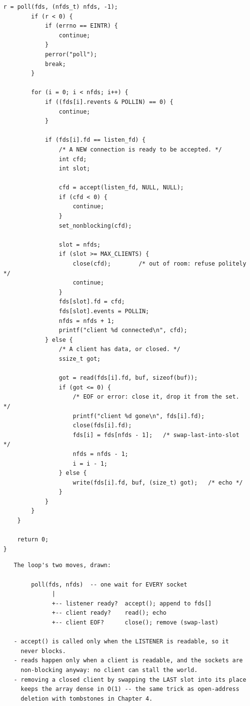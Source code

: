 \begin{lstlisting}[caption={echo\_server.c: a poll-driven, multi-client echo server.}]
        r = poll(fds, (nfds_t) nfds, -1);
        if (r < 0) {
            if (errno == EINTR) {
                continue;
            }
            perror("poll");
            break;
        }

        for (i = 0; i < nfds; i++) {
            if ((fds[i].revents & POLLIN) == 0) {
                continue;
            }

            if (fds[i].fd == listen_fd) {
                /* A NEW connection is ready to be accepted. */
                int cfd;
                int slot;

                cfd = accept(listen_fd, NULL, NULL);
                if (cfd < 0) {
                    continue;
                }
                set_nonblocking(cfd);

                slot = nfds;
                if (slot >= MAX_CLIENTS) {
                    close(cfd);        /* out of room: refuse politely */
                    continue;
                }
                fds[slot].fd = cfd;
                fds[slot].events = POLLIN;
                nfds = nfds + 1;
                printf("client %d connected\n", cfd);
            } else {
                /* A client has data, or closed. */
                ssize_t got;

                got = read(fds[i].fd, buf, sizeof(buf));
                if (got <= 0) {
                    /* EOF or error: close it, drop it from the set. */
                    printf("client %d gone\n", fds[i].fd);
                    close(fds[i].fd);
                    fds[i] = fds[nfds - 1];   /* swap-last-into-slot */
                    nfds = nfds - 1;
                    i = i - 1;
                } else {
                    write(fds[i].fd, buf, (size_t) got);   /* echo */
                }
            }
        }
    }

    return 0;
}
\end{lstlisting}

\begin{verbatim}
   The loop's two moves, drawn:

        poll(fds, nfds)  -- one wait for EVERY socket
              |
              +-- listener ready?  accept(); append to fds[]
              +-- client ready?    read(); echo
              +-- client EOF?      close(); remove (swap-last)

   - accept() is called only when the LISTENER is readable, so it
     never blocks.
   - reads happen only when a client is readable, and the sockets are
     non-blocking anyway: no client can stall the world.
   - removing a closed client by swapping the LAST slot into its place
     keeps the array dense in O(1) -- the same trick as open-address
     deletion with tombstones in Chapter 4.
\end{verbatim}

